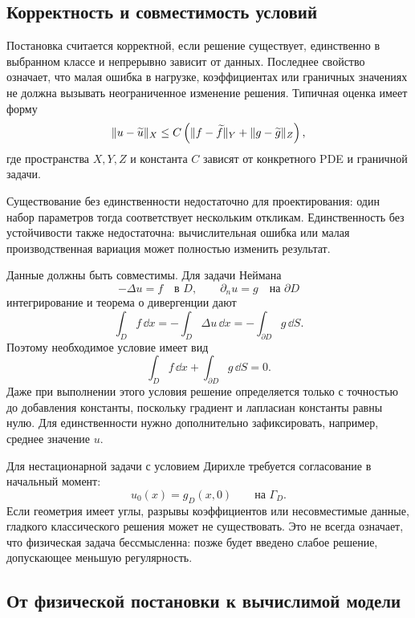 \subsection{Корректность и совместимость условий}

Постановка считается корректной, если решение существует, единственно в выбранном классе и непрерывно зависит от данных. Последнее свойство означает, что малая ошибка в нагрузке, коэффициентах или граничных значениях не должна вызывать неограниченное изменение решения. Типичная оценка имеет форму
\begin{equation}
\label{eq:pde-stability-estimate-v01}
\lVert u-\widetilde u\rVert_{X}
\leq
C\left(
\lVert f-\widetilde f\rVert_{Y}
+
\lVert g-\widetilde g\rVert_{Z}
\right),
\end{equation}
где пространства $X,Y,Z$ и константа $C$ зависят от конкретного PDE и граничной задачи.

Существование без единственности недостаточно для проектирования: один набор параметров тогда соответствует нескольким откликам. Единственность без устойчивости также недостаточна: вычислительная ошибка или малая производственная вариация может полностью изменить результат.

Данные должны быть совместимы. Для задачи Неймана
\[
-\Delta u=f
\quad\text{в }D,
\qquad
\partial_nu=g
\quad\text{на }\partial D
\]
интегрирование и теорема о дивергенции дают
\[
\int_D f\,\dd x
=
-\int_D\Delta u\,\dd x
=
-\int_{\partial D}g\,\dd S.
\]
Поэтому необходимое условие имеет вид
\begin{equation}
\label{eq:neumann-compatibility-v01}
\int_D f\,\dd x
+
\int_{\partial D}g\,\dd S
=0.
\end{equation}
Даже при выполнении этого условия решение определяется только с точностью до добавления константы, поскольку градиент и лапласиан константы равны нулю. Для единственности нужно дополнительно зафиксировать, например, среднее значение $u$.

Для нестационарной задачи с условием Дирихле требуется согласование в начальный момент:
\[
u_0(x)=g_D(x,0)
\qquad
\text{на }\Gamma_D.
\]
Если геометрия имеет углы, разрывы коэффициентов или несовместимые данные, гладкого классического решения может не существовать. Это не всегда означает, что физическая задача бессмысленна: позже будет введено слабое решение, допускающее меньшую регулярность.

\subsection{От физической постановки к вычислимой модели}

